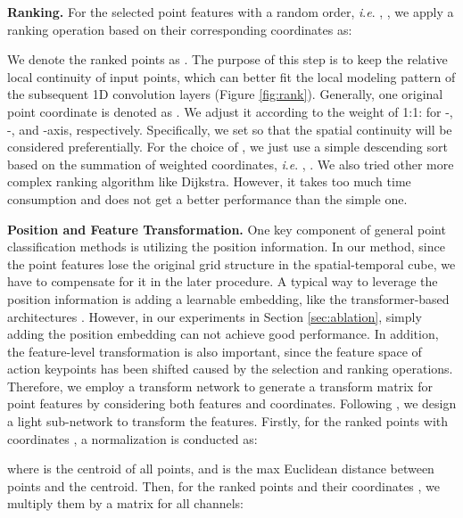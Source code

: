 \documentclass[journal]{IEEEtran}
\newcommand{\ie}{\textit{i}.\textit{e}. }
\begin{document}
\textbf{Ranking.}
For the selected point features with a random order, \ie, , we apply a ranking operation  based on their corresponding coordinates  as:

We denote the ranked points as .
The purpose of this step is to keep the relative local continuity of input points, which can better fit the local modeling pattern of the subsequent 1D convolution layers (Figure \ref{fig:rank}).
Generally, one original point coordinate  is denoted as .
We adjust it according to the weight of 1:1: for -, -, and -axis, respectively.
Specifically, we set  so that the spatial continuity will be considered preferentially.
For the choice of , we just use a simple descending sort based on the summation of weighted coordinates, \ie, .
We also tried other more complex ranking algorithm like Dijkstra.
However, it takes too much time consumption and does not get a better performance than the simple one.














\textbf{Position and Feature Transformation.}
One key component of general point classification methods is utilizing the position information.
In our method, since the point features lose the original grid structure in the spatial-temporal cube, we have to compensate for it in the later procedure.
A typical way to leverage the position information is adding a learnable embedding, like the transformer-based architectures \cite{vaswani2017attention,dosovitskiy2020image}.
However, in our experiments in Section \ref{sec:ablation}, simply adding the position embedding can not achieve good performance.
In addition, the feature-level transformation is also important, since the feature space of action keypoints has been shifted caused by the selection and ranking operations.
Therefore, we employ a transform network to generate a transform matrix for point features by considering both features and coordinates. 
Following \cite{qi2017pointnet, qi2017pointnet++}, we design a light sub-network to transform the features.
Firstly, for the ranked points with coordinates , a normalization is conducted as:

where  is the centroid of all points, and  is the max Euclidean distance between points and the centroid.
Then, for the ranked points  and their coordinates , we multiply them by a matrix for all channels:
\end{document}
